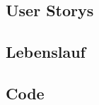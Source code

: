 \documentclass[a4paper,12pt]{article}
\begin{document}
\subsection*{User Storys}


%

\subsection*{Lebenslauf}


\subsection*{Code}

\end{document}
